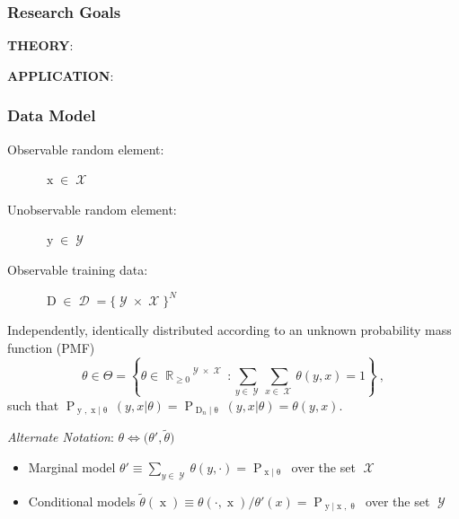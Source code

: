 \documentclass[aspectratio=169,usenames,dvipsnames]{beamer}
\DeclareMathOperator{\xrm}{\mathrm{x}}
\DeclareMathOperator{\yrm}{\mathrm{y}}
\DeclareMathOperator{\Drm}{\mathrm{D}}
\DeclareMathOperator{\Prm}{\mathrm{P}}
\DeclareMathOperator{\Xcal}{\mathcal{X}}
\DeclareMathOperator{\Ycal}{\mathcal{Y}}
\DeclareMathOperator{\Dcal}{\mathcal{D}}
\DeclareMathOperator{\Rbb}{\mathbb{R}}
\begin{document}
\begin{frame}
\frametitle{Research Goals}

\textbf{THEORY}:

\vspace{1em}
{}

\vspace{2em}

\textbf{APPLICATION}:

\vspace{1em}
\centering
{}

\end{frame}



\begin{frame}
\frametitle{Data Model}

\begin{description}
\item[Observable random element:] $\xrm \in \Xcal$
\item[Unobservable random element:] $\yrm \in \Ycal$
\item[Observable training data:] $\Drm \in \Dcal = \{\Ycal \times \Xcal\}^N$
\end{description}

\vspace{0.5em}

Independently, identically distributed according to an \alert{unknown} probability mass function (PMF) 
\begin{equation*}
\theta \in \Theta = \left\{ \theta \in {\Rbb_{\geq 0}}^{\Ycal \times \Xcal}: \sum_{y \in \Ycal} \sum_{x \in \Xcal} \theta(y,x) = 1 \right\} \ ,
\end{equation*}
such that $\Prm_{\yrm,\xrm | \uptheta}(y,x | \theta) = \Prm_{\Drm_n | \uptheta}(y,x | \theta) = \theta(y,x)$.

\hrulefill

\vspace{0.5em}
\textit{Alternate Notation}: $\theta \Leftrightarrow \big( \theta',\tilde{\theta} \big)$
\begin{itemize}
\item Marginal model $\theta' \equiv \sum_{y \in \Ycal} \theta(y,\cdot) = \Prm_{\xrm | \uptheta}$ over the set $\Xcal$ 
\item Conditional models $\tilde{\theta}(\xrm) \equiv \theta(\cdot,\xrm) / \theta'(x) = \Prm_{\yrm | \xrm,\uptheta}$ over the set $\Ycal$
\end{itemize}

\end{frame}
\end{document}
